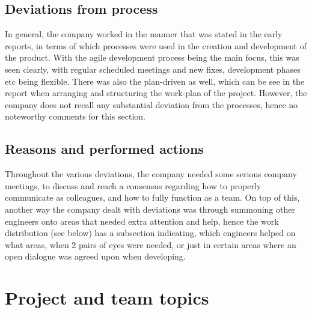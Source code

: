 \documentclass{article}
\begin{document}
\begin{comment}
 - Sickness
 - Lack of attendance at company meetings
 - Delayed functionalities 
 - External clients (other courses)
\end{comment}

\subsection*{Deviations from process}
In general, the company worked in the manner that was stated in the early reports, in terms of which processes were used in the creation and development of the product. With the agile development process being the main focus, this was seen clearly, with regular scheduled meetings and new fixes, development phases etc being flexible. There was also the plan-driven as well, which can be see in the report when arranging and structuring the work-plan of the project. However, the company does not recall any substantial deviation from the processes, hence no noteworthy comments for this section.
\subsection*{Reasons and performed actions}

Throughout the various deviations, the company needed some serious company meetings, to discuss and reach a consensus regarding how to properly communicate as colleagues, and how to fully function as a team. 
\newline
On top of this, another way the company dealt with deviations was through summoning other engineers onto areas that needed extra attention and help, hence the work distribution (see below) has a subsection indicating, which engineers helped on what areas, when 2 pairs of eyes were needed, or just in certain areas where an open dialogue was agreed upon when developing.
\newpage

\section*{Project and team topics}
\end{document}
